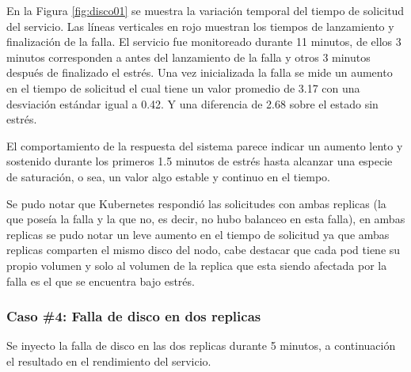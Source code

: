 \par En la Figura \ref{fig:disco01} se muestra la variación temporal del tiempo de solicitud del servicio. Las líneas verticales en rojo muestran los tiempos de lanzamiento y finalización de la falla. El servicio fue monitoreado durante 11 minutos, de ellos 3 minutos corresponden a antes del lanzamiento de la falla y otros 3 minutos después de finalizado el estrés. Una vez inicializada la falla se mide un aumento en el tiempo de solicitud el cual tiene un valor promedio de 3.17 con una desviación estándar igual a 0.42. Y una diferencia de 2.68 sobre el estado sin estrés.\\

\par El comportamiento de la respuesta del sistema parece indicar un aumento lento y sostenido durante los primeros 1.5 minutos de estrés hasta alcanzar una especie de saturación, o sea, un valor algo estable y continuo en el tiempo.\\

\par Se pudo notar que Kubernetes respondió las solicitudes con ambas replicas (la que poseía la falla y la que no, es decir, no hubo balanceo en esta falla), en ambas replicas se pudo notar un leve aumento en el tiempo de solicitud ya que ambas replicas comparten el mismo disco del nodo, cabe destacar que cada pod tiene su propio volumen y solo al volumen de la replica que esta siendo afectada por la falla es el que se encuentra bajo estrés. \\



\subsubsection{Caso \#4: Falla de disco en dos replicas}


\par Se inyecto la falla de disco en las dos replicas durante 5 minutos, a continuación el resultado en el rendimiento del servicio.\\

